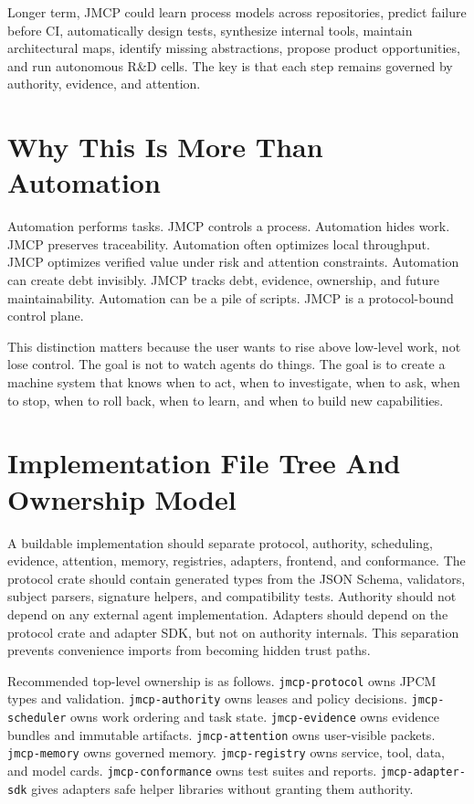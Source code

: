 \documentclass[10pt,journal,onecolumn]{IEEEtran}
\begin{document}
Longer term, JMCP could learn process models across repositories, predict failure before CI, automatically design tests, synthesize internal tools, maintain architectural maps, identify missing abstractions, propose product opportunities, and run autonomous R\&D cells. The key is that each step remains governed by authority, evidence, and attention.

\section{Why This Is More Than Automation}
Automation performs tasks. JMCP controls a process. Automation hides work. JMCP preserves traceability. Automation often optimizes local throughput. JMCP optimizes verified value under risk and attention constraints. Automation can create debt invisibly. JMCP tracks debt, evidence, ownership, and future maintainability. Automation can be a pile of scripts. JMCP is a protocol-bound control plane.

This distinction matters because the user wants to rise above low-level work, not lose control. The goal is not to watch agents do things. The goal is to create a machine system that knows when to act, when to investigate, when to ask, when to stop, when to roll back, when to learn, and when to build new capabilities.




\section{Implementation File Tree And Ownership Model}
A buildable implementation should separate protocol, authority, scheduling, evidence, attention, memory, registries, adapters, frontend, and conformance. The protocol crate should contain generated types from the JSON Schema, validators, subject parsers, signature helpers, and compatibility tests. Authority should not depend on any external agent implementation. Adapters should depend on the protocol crate and adapter SDK, but not on authority internals. This separation prevents convenience imports from becoming hidden trust paths.

Recommended top-level ownership is as follows. \texttt{jmcp-protocol} owns JPCM types and validation. \texttt{jmcp-authority} owns leases and policy decisions. \texttt{jmcp-scheduler} owns work ordering and task state. \texttt{jmcp-evidence} owns evidence bundles and immutable artifacts. \texttt{jmcp-attention} owns user-visible packets. \texttt{jmcp-memory} owns governed memory. \texttt{jmcp-registry} owns service, tool, data, and model cards. \texttt{jmcp-conformance} owns test suites and reports. \texttt{jmcp-adapter-sdk} gives adapters safe helper libraries without granting them authority.
\end{document}
